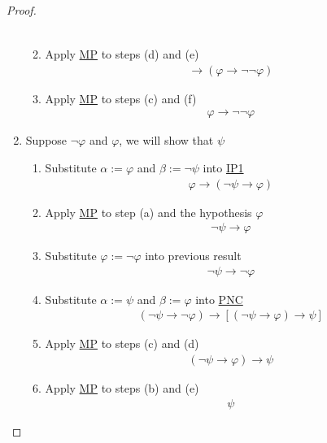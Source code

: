 \documentclass{treatise}
\begin{document}
\begin{proof}
\begin{enumerate}
\begin{enumerate}
\begin{align*}
        \end{align*}
        \item Apply \hyperref[HPL-R-MP]{MP} to steps (d) and (e)
        \begin{align*}
            [(\neg \neg \neg \varphi \to \varphi) \to \neg \neg \varphi] \to (\varphi \to \neg \neg \varphi)
        \end{align*}
        \item Apply \hyperref[HPL-R-MP]{MP} to steps (c) and (f)
        \begin{align*}
            \varphi \to \neg \neg \varphi
        \end{align*}
    \end{enumerate}
    \item Suppose $\neg \varphi$ and $\varphi$, we will show that $\psi$
    \begin{enumerate}
        \item Substitute $\alpha := \varphi$ and $\beta := \neg \psi$ into \hyperref[HPL-A-IP1]{IP1}
        \begin{align*}
            \varphi \to (\neg \psi \to \varphi)
        \end{align*}
        \item Apply \hyperref[HPL-R-MP]{MP} to step (a) and the hypothesis $\varphi$
        \begin{align*}
            \neg \psi \to \varphi
        \end{align*}
        \item Substitute $\varphi := \neg \varphi$ into previous result
        \begin{align*}
            \neg \psi \to \neg \varphi
        \end{align*}
        \item Substitute $\alpha := \psi$ and $\beta := \varphi$ into \hyperref[HPL-A-PNC]{PNC}
        \begin{align*}
            (\neg \psi \to \neg \varphi) \to [(\neg \psi \to \varphi) \to \psi]
        \end{align*}
        \item Apply \hyperref[HPL-R-MP]{MP} to steps (c) and (d)
        \begin{align*}
            (\neg \psi \to \varphi) \to \psi
        \end{align*}
        \item Apply \hyperref[HPL-R-MP]{MP} to steps (b) and (e)
        \begin{align*}
            \psi
        \end{align*}

\end{enumerate}
\end{enumerate}
\end{proof}
\end{document}
